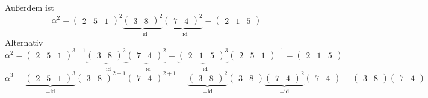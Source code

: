 \documentclass{scrreprt}
\begin{document}
\begin{enumerate}[(a)]
\begin{itemize}
    Außerdem ist
    \[
      \alpha^2 = \begin{pmatrix} 2 & 5 & 1 \end{pmatrix}^2
      \underset{=\text{id}}{\underbrace{\begin{pmatrix} 3 & 8 \end{pmatrix}^2}}
      \underset{=\text{id}}{\underbrace{\begin{pmatrix} 7 & 4 \end{pmatrix}^2}}
      = \begin{pmatrix} 2 & 1 & 5\end{pmatrix}
    \]
    Alternativ
    \[
      \alpha^2 = \begin{pmatrix} 2 & 5 & 1 \end{pmatrix}^{3 - 1}
      \underset{=\text{id}}{\underbrace{\begin{pmatrix} 3 & 8 \end{pmatrix}^2}}
      \underset{=\text{id}}{\underbrace{\begin{pmatrix} 7 & 4 \end{pmatrix}^2}}
      = \underset{=\text{id}}{\underbrace{\begin{pmatrix} 2 & 1 & 5 \end{pmatrix}^3}}
      \begin{pmatrix} 2 & 5 & 1 \end{pmatrix}^{-1}
      = \begin{pmatrix} 2 & 1 & 5\end{pmatrix}
    \]
    \[
      \alpha^3 = \underset{=\text{id}}{\underbrace{\begin{pmatrix} 2 & 5 & 1 \end{pmatrix}^3}}
      \begin{pmatrix} 3 & 8 \end{pmatrix}^{2 + 1}
      \begin{pmatrix} 7 & 4 \end{pmatrix}^{2 + 1}
      = \underset{=\text{id}}{\underbrace{\begin{pmatrix} 3 & 8 \end{pmatrix}^2}}
      \begin{pmatrix} 3 & 8 \end{pmatrix}
      \underset{=\text{id}}{\underbrace{\begin{pmatrix} 7 & 4 \end{pmatrix}^2}}
      \begin{pmatrix} 7 & 4 \end{pmatrix}
      = \begin{pmatrix} 3 & 8 \end{pmatrix} \begin{pmatrix} 7 & 4 \end{pmatrix}
\]
\end{itemize}
\end{enumerate}
\end{document}
